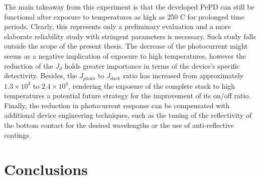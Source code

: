 The main takeaway from this experiment is that the developed PePD can still be functional after exposure to temperatures as high as 250 \degree C for prolonged time periods. Clearly, this represents only a preliminary evaluation and a more elaborate reliability study with stringent parameters is necessary. Such study falls outside the scope of the present thesis. The decrease of the photocurrent might seems as a negative implication of exposure to high temperatures, however the reduction of the $J_d$ holds greater importance in terms of the device's specific detectivity. Besides, the $J_{photo}$ to $J_{dark}$ ratio has increased from approximately $1.3\times 10^3$ to $2.4\times 10^4$, rendering the exposure of the complete stack to high temperatures a potential future strategy for the improvement of its on/off ratio. Finally, the reduction in photocurrent response can be compensated with additional device engineering techniques, such as the tuning of the reflectivity of the bottom contact for the desired wavelengths or the use of anti-reflective coatings. 


\section{Conclusions}

